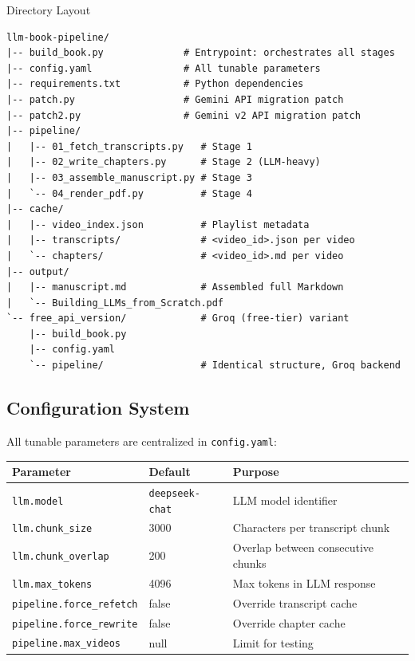 \documentclass[11pt,a4paper]{article}
\begin{document}
\begin{codebox}{Directory Layout}
\begin{verbatim}
llm-book-pipeline/
|-- build_book.py              # Entrypoint: orchestrates all stages
|-- config.yaml                # All tunable parameters
|-- requirements.txt           # Python dependencies
|-- patch.py                   # Gemini API migration patch
|-- patch2.py                  # Gemini v2 API migration patch
|-- pipeline/
|   |-- 01_fetch_transcripts.py   # Stage 1
|   |-- 02_write_chapters.py      # Stage 2 (LLM-heavy)
|   |-- 03_assemble_manuscript.py # Stage 3
|   `-- 04_render_pdf.py          # Stage 4
|-- cache/
|   |-- video_index.json          # Playlist metadata
|   |-- transcripts/              # <video_id>.json per video
|   `-- chapters/                 # <video_id>.md per video
|-- output/
|   |-- manuscript.md             # Assembled full Markdown
|   `-- Building_LLMs_from_Scratch.pdf
`-- free_api_version/             # Groq (free-tier) variant
    |-- build_book.py
    |-- config.yaml
    `-- pipeline/                 # Identical structure, Groq backend
\end{verbatim}
\end{codebox}

\subsection{Configuration System}

All tunable parameters are centralized in \texttt{config.yaml}:

\begin{center}
\begin{tabular}{lll}
\toprule
\textbf{Parameter} & \textbf{Default} & \textbf{Purpose}\\
\midrule
\texttt{llm.model} & \texttt{deepseek-chat} & LLM model identifier\\
\texttt{llm.chunk\_size} & 3000 & Characters per transcript chunk\\
\texttt{llm.chunk\_overlap} & 200 & Overlap between consecutive chunks\\
\texttt{llm.max\_tokens} & 4096 & Max tokens in LLM response\\
\texttt{pipeline.force\_refetch} & false & Override transcript cache\\
\texttt{pipeline.force\_rewrite} & false & Override chapter cache\\
\texttt{pipeline.max\_videos} & null & Limit for testing\\
\bottomrule
\end{tabular}
\end{center}
\end{document}
